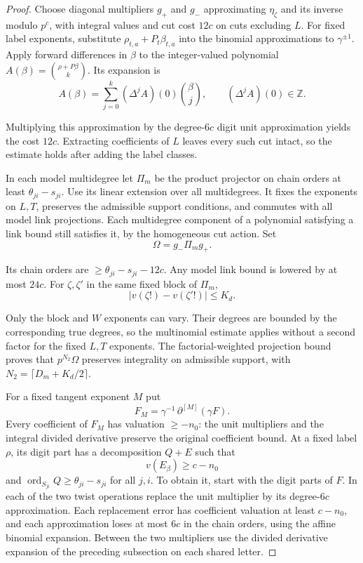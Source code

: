 \begin{proof}
Choose diagonal multipliers \(g_+\) and \(g_-\) approximating
\(\eta_\zeta\) and its inverse modulo \(p^c\), with
integral values and cut cost \(12c\) on cuts excluding \(L\).
For fixed label exponents, substitute
\(\rho_{t,a}+P_t\beta_{t,a}\) into the binomial approximations
to \(\gamma^{\pm1}\). Apply forward differences in \(\beta\) to the integer-valued polynomial \(A(\beta)=\binom{\rho+P\beta}{k}\). Its expansion is
\[
 A(\beta)=\sum_{j=0}^k(\Delta^j A)(0)\binom{\beta}{j},\qquad (\Delta^j A)(0)\in\mathbb Z.
\]

Multiplying this approximation by the degree-\(6c\) digit
unit approximation yields the cost \(12c\). Extracting
coefficients of \(L\) leaves every such cut intact, so the
estimate holds after adding the label classes.

In each model multidegree let \(\Pi_m\) be the product
projector on chain orders at least \(\theta_{ji}-s_{ji}\).
Use its linear extension over all multidegrees. It fixes
the exponents on \(L,T\), preserves the admissible support
conditions, and commutes with all model link projections.
Each multidegree component of a polynomial satisfying a
link bound still satisfies it, by the homogeneous cut action.
 Set
\[
 \Omega=g_-\Pi_m g_+.
\]

Its chain orders are \(\ge\theta_{ji}-s_{ji}-12c\).
Any model link bound is lowered by at most \(24c\).
For \(\zeta,\zeta'\) in the same fixed block of \(\Pi_m\),
\[
 \lvert v(\zeta!)-v(\zeta'!)\rvert\le K_d.
\]

Only the block and \(W\) exponents can vary. Their degrees
are bounded by the corresponding true degrees, so the
multinomial estimate applies without a second factor for
the fixed \(L,T\) exponents. The factorial-weighted projection
bound proves that \(p^{N_2}\Omega\) preserves integrality
on admissible support, with
\(N_2=\lceil D_m+K_d/2\rceil\).

For a fixed tangent exponent \(M\) put
\[
         F_M=\gamma^{-1}\,\partial^{[M]}(\gamma F).
\]
Every coefficient of \(F_M\) has valuation \(\ge -n_0\):
the unit multipliers and the integral divided derivative
preserve the original coefficient bound. At a fixed label
\(\rho\), its digit part has a decomposition \(Q+E\) such
that
\[
 v(E_\beta)\ge c-n_0
\]
and
\(\operatorname{ord}_{S_{ji}}Q\ge\theta_{ji}-s_{ji}\)
for all \(j,i\). To obtain it, start with the digit parts
of \(F\). In each of the two twist operations replace the
unit multiplier by its degree-\(6c\) approximation. Each
replacement error has coefficient valuation at least
\(c-n_0\), and each approximation loses at most \(6c\) in
the chain orders, using the affine binomial expansion.
Between the two multipliers use the divided derivative
expansion of the preceding subsection on each shared letter.


\end{proof}
